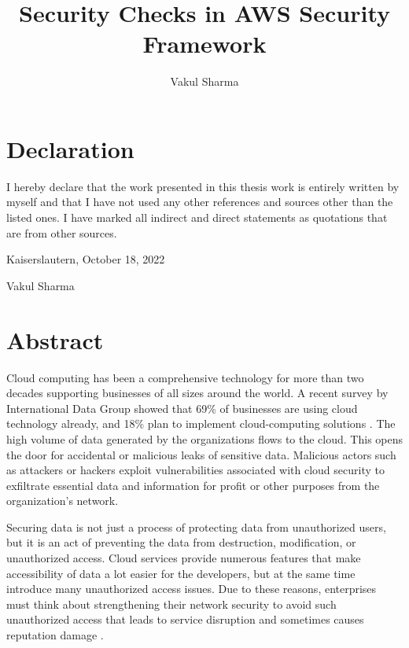 \documentclass[a4paper,11pt]{report}
\newcommand\blankpage{%
    \null
    \thispagestyle{empty}%
    \addtocounter{page}{-1}%
    \newpage}
\begin{document}
\title{Security Checks in AWS Security Framework}

\author{Vakul Sharma}

\maketitle


\afterpage{\blankpage}
\cleardoublepage
\section*{Declaration}
\text
I hereby declare that the work presented in this thesis work is entirely written by myself and that I have not used any other references and sources other than the listed ones.
I have marked all indirect and direct statements as
quotations that are from other sources.\\

\raggedright{Kaiserslautern, October 18, 2022}\\

\hfill \break
\raggedright{Vakul Sharma}

\afterpage{\blankpage}
\cleardoublepage

\section*{Abstract}
\text
Cloud computing has been a comprehensive technology for more
than two decades supporting
businesses of all sizes around the world.
A recent survey by International Data Group showed that 69\%
of businesses are using cloud technology already, and
18\% plan
to implement cloud-computing solutions \cite{1}.
The high volume of data generated by the organizations flows to the cloud.
This opens the door for accidental or malicious leaks of sensitive data.
Malicious actors such as attackers or hackers exploit vulnerabilities associated with cloud security to exfiltrate essential data and information for profit or other purposes from the organization’s network.

\hfill \break

Securing data is not just a process of protecting data
from unauthorized users, but it is an act of preventing
the data from destruction, modification, or
unauthorized access.
Cloud services provide numerous features that make accessibility of data a lot easier for the developers, but at the same time introduce many unauthorized access issues.
Due to these reasons, enterprises must think
about strengthening
their network security to avoid such unauthorized access that leads to service disruption and sometimes causes reputation damage \cite{1}.
\end{document}
